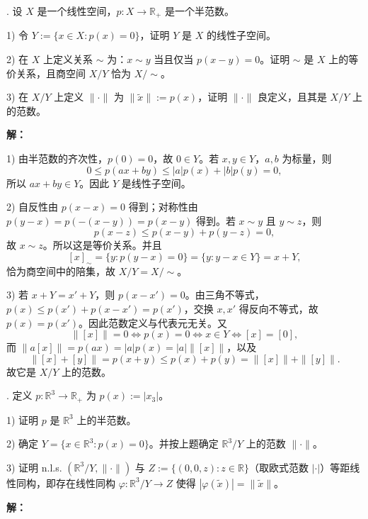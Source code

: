 \documentclass{article}
\begin{document}
\par\medskip{}. 设 $X$ 是一个线性空间，$p:X\to\mathbb R_+$ 是一个半范数。

1) 令 $Y:=\{x\in X:p(x)=0\}$，证明 $Y$ 是 $X$ 的线性子空间。

2) 在 $X$ 上定义关系 $\sim$ 为：$x\sim y$ 当且仅当 $p(x-y)=0$。证明 $\sim$ 是 $X$ 上的等价关系，且商空间 $X/Y$ 恰为 $X/{\sim}$。

3) 在 $X/Y$ 上定义 $\|\cdot\|$ 为 $\|\widetilde x\|:=p(x)$，证明 $\|\cdot\|$ 良定义，且其是 $X/Y$ 上的范数。


\par{}\noindent\textbf{解：}\par\nopagebreak[4]



1) 由半范数的齐次性，$p(0)=0$，故 $0\in Y$。若 $x,y\in Y$，$a,b$ 为标量，则
\[
0\le p(ax+by)\le |a|p(x)+|b|p(y)=0,
\]
所以 $ax+by\in Y$。因此 $Y$ 是线性子空间。

2) 自反性由 $p(x-x)=0$ 得到；对称性由 $p(y-x)=p(-(x-y))=p(x-y)$ 得到。若 $x\sim y$ 且 $y\sim z$，则
\[
p(x-z)\le p(x-y)+p(y-z)=0,
\]
故 $x\sim z$。所以这是等价关系。并且
\[
[x]_{\sim}=\{y:p(y-x)=0\}=\{y:y-x\in Y\}=x+Y,
\]
恰为商空间中的陪集，故 $X/Y=X/{\sim}$。

3) 若 $x+Y=x'+Y$，则 $p(x-x')=0$。由三角不等式，$p(x)\le p(x')+p(x-x')=p(x')$，交换 $x,x'$ 得反向不等式，故 $p(x)=p(x')$。因此范数定义与代表元无关。又
\[
\|[x]\|=0\iff p(x)=0\iff x\in Y\iff[x]=[0],
\]
而 $\|a[x]\|=p(ax)=|a|p(x)=|a|\|[x]\|$，以及
\[
\|[x]+[y]\|=p(x+y)\le p(x)+p(y)=\|[x]\|+\|[y]\|.
\]
故它是 $X/Y$ 上的范数。


\par\medskip{}. 定义 $p:\mathbb R^3\to\mathbb R_+$ 为 $p(x):=|x_3|$。

1) 证明 $p$ 是 $\mathbb R^3$ 上的半范数。

2) 确定 $Y=\{x\in\mathbb R^3:p(x)=0\}$。并按上题确定 $\mathbb R^3/Y$ 上的范数 $\|\cdot\|$。

3) 证明 n.l.s. $(\mathbb R^3/Y,\|\cdot\|)$ 与 $Z:=\{(0,0,z):z\in\mathbb R\}$（取欧式范数 $|\cdot|$）等距线性同构，即存在线性同构 $\varphi:\mathbb R^3/Y\to Z$ 使得 $|\varphi(\widetilde x)|=\|\widetilde x\|$。


\par{}\noindent\textbf{解：}\par\nopagebreak[4]
\end{document}
